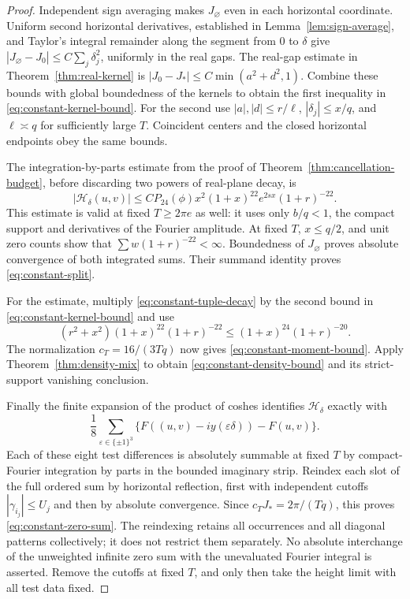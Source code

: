 \documentclass[11pt]{article}
\begin{document}
\begin{proof}
Independent sign averaging makes $J_\varnothing$ even in each horizontal
coordinate. Uniform second horizontal derivatives, established in
Lemma~\ref{lem:sign-average}, and Taylor's integral remainder along the
segment from $0$ to $\delta$ give
$|J_\varnothing-J_0|\leq C\sum_j\delta_j^2$, uniformly in the real gaps.
The real-gap estimate in Theorem~\ref{thm:real-kernel} is
$|J_0-J_*|\leq C\min(a^2+d^2,1)$.
Combine these bounds with global boundedness of the kernels to obtain
the first inequality in \eqref{eq:constant-kernel-bound}.
For the second use $|a|,|d|\leq r/\ell$, $|\delta_j|\leq x/q$,
and $\ell\asymp q$ for sufficiently large $T$. Coincident centers and
the closed horizontal endpoints obey the same bounds.

The integration-by-parts estimate from the proof of
Theorem~\ref{thm:cancellation-budget}, before discarding two powers of
real-plane decay, is
\begin{equation}\label{eq:constant-tuple-decay}
 |\mathcal H_\delta(u,v)|\leq
 CP_{24}(\phi)x^2(1+x)^{22}e^{2sx}(1+r)^{-22}.
\end{equation}
This estimate is valid at fixed $T\geq2\pi e$ as well: it uses only
$b/q<1$, the compact support and derivatives of the Fourier amplitude.
At fixed $T$, $x\leq q/2$, and unit zero counts show that
$\sum w(1+r)^{-22}<\infty$. Boundedness of $J_\varnothing$ proves
absolute convergence of both integrated sums. Their summand identity
proves \eqref{eq:constant-split}.

For the estimate, multiply \eqref{eq:constant-tuple-decay} by the second
bound in \eqref{eq:constant-kernel-bound} and use
\[
 (r^2+x^2)(1+x)^{22}(1+r)^{-22}
 \leq (1+x)^{24}(1+r)^{-20}.
\]
The normalization $c_T=16/(3Tq)$ now gives
\eqref{eq:constant-moment-bound}. Apply
Theorem~\ref{thm:density-mix} to obtain \eqref{eq:constant-density-bound}
and its strict-support vanishing conclusion.

Finally the finite expansion of the product of coshes identifies
$\mathcal H_\delta$ exactly with
\[
 \frac18\sum_{\varepsilon\in\{\pm1\}^3}
 \{F((u,v)-iy(\varepsilon\delta))-F(u,v)\}.
\]
Each of these eight test differences is absolutely summable at fixed $T$
by compact-Fourier integration by parts in the bounded imaginary strip.
Reindex each slot of the full ordered sum by horizontal reflection,
first with independent cutoffs $|\gamma_{i_j}|\leq U_j$ and then by
absolute convergence. Since $c_TJ_*=2\pi/(Tq)$, this proves
\eqref{eq:constant-zero-sum}. The reindexing retains all occurrences and
all diagonal patterns collectively; it does not restrict them separately.
No absolute interchange of the unweighted infinite zero sum with the
unevaluated Fourier integral is asserted. Remove the cutoffs at fixed
$T$, and only then take the height limit with all test data fixed.
\end{proof}
\end{document}
